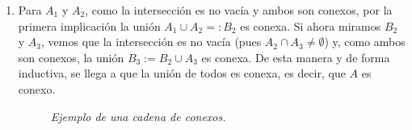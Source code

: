 \begin{demo}
\begin{enumerate}
\item Para $A_1$ y $A_2$, como la intersección es no vacía y ambos son conexos, por la primera implicación la unión $A_1 \cup A_2 =: B_2$ es conexa. Si ahora miramos $B_2$ y $A_3$, vemos que la intersección es no vacía (pues $A_2 \cap A_3\neq \emptyset$) y, como ambos son conexos, la unión $B_3 := B_2 \cup A_3$ es conexa. De esta manera y de forma inductiva, se llega a que la unión de todos es conexa, es decir, que $A$ es conexo.
\begin{figure}[H]
            \centering
            \caption{\textit{Ejemplo de una cadena de conexos.}}
            \label{fig:cadena-de-conexos}
\end{figure}
\end{enumerate}
\end{demo}

